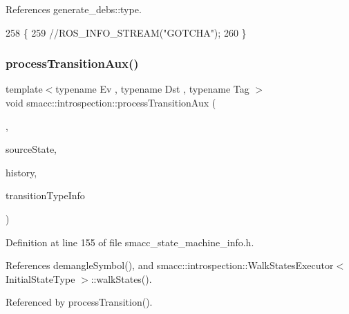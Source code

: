 References generate\+\_\+debs\+::type.


\begin{DoxyCode}
258 \{
259     \textcolor{comment}{//ROS\_INFO\_STREAM("GOTCHA");}
260 \}
\end{DoxyCode}
\mbox{\label{namespacesmacc_1_1introspection_a208cd71dc5579090d40b3d3b9efb28a6}} 
\subsubsection{\texorpdfstring{process\+Transition\+Aux()}{processTransitionAux()}}
{\footnotesize\ttfamily template$<$typename Ev , typename Dst , typename Tag $>$ \\
void smacc\+::introspection\+::process\+Transition\+Aux (\begin{DoxyParamCaption}\item[{\hyperlink{classsmacc_1_1Transition}{smacc\+::\+Transition}$<$ Ev, Dst, Tag $>$ $\ast$}]{,  }\item[{std\+::shared\+\_\+ptr$<$ \hyperlink{classsmacc_1_1introspection_1_1SmaccStateInfo}{Smacc\+State\+Info} $>$ \&}]{source\+State,  }\item[{\hyperlink{classbool}{bool}}]{history,  }\item[{\hyperlink{classsmacc_1_1introspection_1_1TypeInfo_aa6ffd9c39811d59f7c771941b7fad860}{Type\+Info\+::\+Ptr} \&}]{transition\+Type\+Info }\end{DoxyParamCaption})}



Definition at line 155 of file smacc\+\_\+state\+\_\+machine\+\_\+info.\+h.



References demangle\+Symbol(), and smacc\+::introspection\+::\+Walk\+States\+Executor$<$ Initial\+State\+Type $>$\+::walk\+States().



Referenced by process\+Transition().


